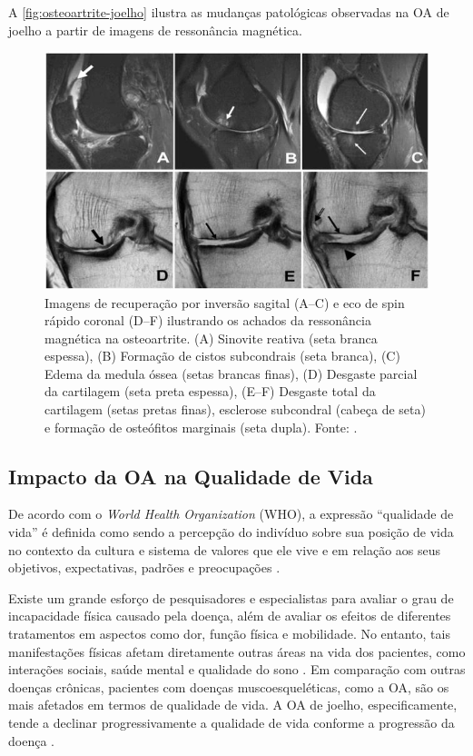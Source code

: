 A \autoref{fig:osteoartrite-joelho} ilustra as mudanças patológicas observadas na OA de joelho a partir de imagens de ressonância magnética.

\begin{figure}[!htbp]
    \centering
    \includegraphics[width=\linewidth]{figs/mud-patologicas-oa.jpg}
    \caption{Imagens de recuperação por inversão sagital (A–C) e eco de spin rápido coronal (D–F) ilustrando os achados da ressonância magnética na osteoartrite. (A) Sinovite reativa (seta branca espessa), (B) Formação de cistos subcondrais (seta branca), (C) Edema da medula óssea (setas brancas finas), (D) Desgaste parcial da cartilagem (seta preta espessa), (E–F) Desgaste total da cartilagem (setas pretas finas), esclerose subcondral (cabeça de seta) e formação de osteófitos marginais (seta dupla). Fonte: .}
    \label{fig:osteoartrite-joelho}
\end{figure}

\subsection{Impacto da OA na Qualidade de Vida}

De acordo com o \textit{World Health Organization} (WHO), a expressão ``qualidade de vida'' é definida como sendo a percepção do indivíduo sobre sua posição de vida no contexto da cultura e sistema de valores que ele vive e em relação aos seus objetivos, expectativas, padrões e preocupações \cite{who2012}.

Existe um grande esforço de pesquisadores e especialistas para avaliar o grau de incapacidade física causado pela doença, além de avaliar os efeitos de diferentes tratamentos em aspectos como dor, função física e mobilidade. No entanto, tais manifestações físicas afetam diretamente outras áreas na vida dos pacientes, como interações sociais, saúde mental e qualidade do sono \cite{Ferrel1992}. Em comparação com outras doenças crônicas, pacientes com doenças muscoesqueléticas, como a OA, são os mais afetados em termos de qualidade de vida. A OA de joelho, especificamente, tende a declinar progressivamente a qualidade de vida conforme a progressão da doença \cite{Hoogeboom2013}.

